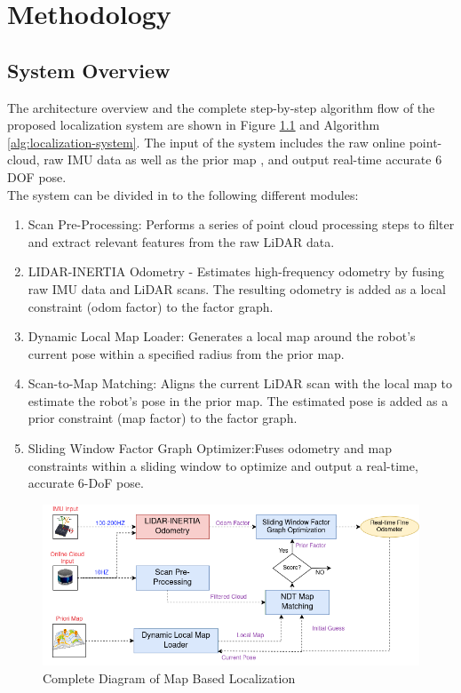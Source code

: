 \chapter{Methodology}
\label{ch:intro}

\section{System Overview}

The architecture overview and the complete step-by-step algorithm flow of the proposed localization system are shown in Figure \ref{fig:diagram-map-basedlocalization} and Algorithm \ref{alg:localization-system}. The input of the system includes the raw online point-cloud, raw IMU data as well as the prior map , and output real-time accurate 6 DOF pose.\\	
The system can be divided in to the following different modules:
\begin{enumerate}
	\item Scan Pre-Processing: Performs a series of point cloud processing steps to filter and extract relevant features from the raw LiDAR data.
	
	\item LIDAR-INERTIA Odometry - Estimates high-frequency odometry by fusing raw IMU data and LiDAR scans. The resulting odometry is added as a local constraint (odom factor) to the factor graph.
	
	\item Dynamic Local Map Loader: Generates a local map around the robot’s current pose within a specified radius from the prior map.
	
	
	\item Scan-to-Map Matching: Aligns the current LiDAR scan with the local map to estimate the robot's pose in the prior map. The estimated pose is added as a prior constraint (map factor) to the factor graph.
	
	\item Sliding Window Factor Graph Optimizer:Fuses odometry and map constraints within a sliding window to optimize and output a real-time, accurate 6-DoF pose.
	
	
\end{enumerate}

\begin{figure}
    \centering
    \includegraphics[width=1\linewidth]{images/system_overview.png}
    \caption{Complete Diagram of Map Based Localization}
    \label{fig:diagram-map-basedlocalization}
\end{figure}


